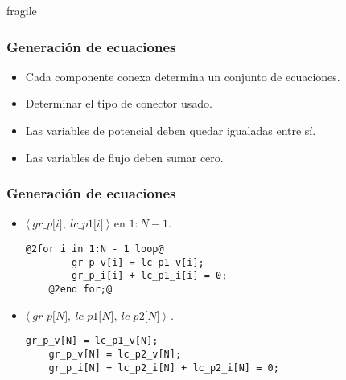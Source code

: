 \begin{frame}{fragile}
\frametitle{Generación de ecuaciones}
\begin{itemize}
\setlength\itemsep{1em}
\item Cada componente conexa determina un conjunto de ecuaciones.
\item Determinar el tipo de conector usado.
\item Las variables de potencial deben quedar igualadas entre sí.
\item Las variables de flujo deben sumar cero. 
\end{itemize}
\end{frame}

\begin{frame}[fragile]
\frametitle{Generación de ecuaciones} 
\begin{itemize}
\item $\langle \ \textit{gr\_p[i]},\ \textit{lc\_p1[i]} \ \rangle$ en $1:N-1$. \\
\vspace{1em}
\begin{lstlisting}[style=base]
    @2for i in 1:N - 1 loop@
        gr_p_v[i] = lc_p1_v[i];
        gr_p_i[i] + lc_p1_i[i] = 0;
    @2end for;@
\end{lstlisting}

\pause
\item $\langle \ \textit{gr\_p[N]},\ \textit{lc\_p1[N]},\ \textit{lc\_p2[N]} \ \rangle$ . \\
\vspace{1em}
\begin{lstlisting}[style=base]
    gr_p_v[N] = lc_p1_v[N];  
    gr_p_v[N] = lc_p2_v[N];
    gr_p_i[N] + lc_p2_i[N] + lc_p2_i[N] = 0;
\end{lstlisting}
\end{itemize}
\end{frame}
